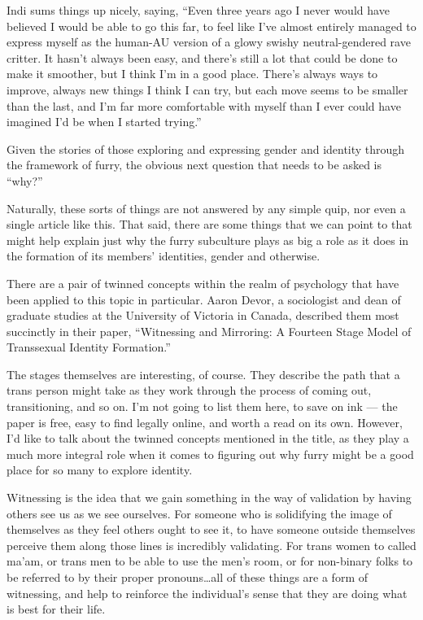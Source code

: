 Indi sums things up nicely, saying, ``Even three years ago I never would have believed I would be able to go this far, to feel like I've almost entirely managed to express myself as the human-AU version of a glowy swishy neutral-gendered rave critter. It hasn't always been easy, and there's still a lot that could be done to make it smoother, but I think I'm in a good place. There's always ways to improve, always new things I think I can try, but each move seems to be smaller than the last, and I'm far more comfortable with myself than I ever could have imagined I'd be when I started trying.''

\secdiv

Given the stories of those exploring and expressing gender and identity through the framework of furry, the obvious next question that needs to be asked is ``why?''

Naturally, these sorts of things are not answered by any simple quip, nor even a single article like this. That said, there are some things that we can point to that might help explain just why the furry subculture plays as big a role as it does in the formation of its members' identities, gender and otherwise.

There are a pair of twinned concepts within the realm of psychology that have been applied to this topic in particular. Aaron Devor, a sociologist and dean of graduate studies at the University of Victoria in Canada, described them most succinctly in their paper, ``Witnessing and Mirroring: A Fourteen Stage Model of Transsexual Identity Formation.''

The stages themselves are interesting, of course. They describe the path that a trans person might take as they work through the process of coming out, transitioning, and so on. I'm not going to list them here, to save on ink --- the paper is free, easy to find legally online, and worth a read on its own. However, I'd like to talk about the twinned concepts mentioned in the title, as they play a much more integral role when it comes to figuring out why furry might be a good place for so many to explore identity.

Witnessing is the idea that we gain something in the way of validation by having others see us as we see ourselves. For someone who is solidifying the image of themselves as they feel others ought to see it, to have someone outside themselves perceive them along those lines is incredibly validating. For trans women to called ma'am, or trans men to be able to use the men's room, or for non-binary folks to be referred to by their proper pronouns\ldots{}all of these things are a form of witnessing, and help to reinforce the individual's sense that they are doing what is best for their life.

